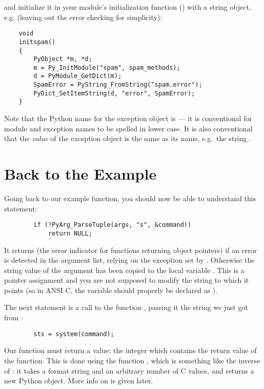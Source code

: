 and initialize it in your module's initialization function
() with a string object, e.g. (leaving out the error
checking for simplicity):

\begin{verbatim}
    void
    initspam()
    {
        PyObject *m, *d;
        m = Py_InitModule("spam", spam_methods);
        d = PyModule_GetDict(m);
        SpamError = PyString_FromString("spam.error");
        PyDict_SetItemString(d, "error", SpamError);
    }
\end{verbatim}

Note that the Python name for the exception object is 
--- it is conventional for module and exception names to be spelled in
lower case.  It is also conventional that the \emph{value} of the
exception object is the same as its name, e.g.\ the string 
.


\section{Back to the Example}

Going back to our example function, you should now be able to
understand this statement:

\begin{verbatim}
        if (!PyArg_ParseTuple(args, "s", &command))
            return NULL;
\end{verbatim}

It returns  (the error indicator for functions returning
object pointers) if an error is detected in the argument list, relying
on the exception set by .  Otherwise the
string value of the argument has been copied to the local variable
.  This is a pointer assignment and you are not supposed
to modify the string to which it points (so in ANSI C, the variable
 should properly be declared as ).

The next statement is a call to the \UNIX{} function ,
passing it the string we just got from :

\begin{verbatim}
        sts = system(command);
\end{verbatim}

Our  function must return a value: the integer
 which contains the return value of the \UNIX{}
 function.  This is done using the function
, which is something like the inverse of
: it takes a format string and an arbitrary
number of C values, and returns a new Python object.  More info on
 is given later.


